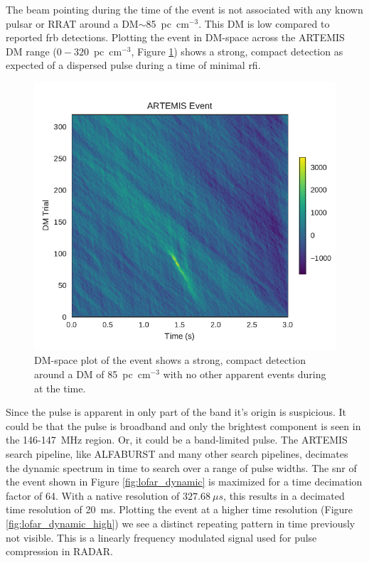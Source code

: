 \documentclass[a4paper,fleqn,usenatbib]{mnras}
\begin{document}
The beam pointing during the time of the event is not associated with any known
pulsar or RRAT around a DM$\sim$85~pc~cm$^{-3}$. This DM is low compared to
reported \gls{frb} detections.
Plotting the event in DM-space across the ARTEMIS DM range
($0-320$~pc~cm$^{-3}$, Figure \ref{fig:lofar_dm_time}) shows a strong, compact
detection as expected of a dispersed pulse during a time of minimal \gls{rfi}.

\begin{figure}
    \includegraphics[width=1.0\linewidth]{figures/LOFAR_dm_time.pdf}
    \caption{DM-space plot of the event shows a strong, compact detection around
    a DM of 85~pc~cm$^{-3}$ with no other apparent events during at the time.
    }
    \label{fig:lofar_dm_time}
\end{figure}

Since the pulse is apparent in only part of the band it's origin is suspicious.
It could be that the pulse is broadband and only the brightest component is seen
in the 146-147~MHz region. Or, it could be a band-limited pulse.  The ARTEMIS
search pipeline, like ALFABURST and many other search pipelines, decimates the
dynamic spectrum in time to search over a range of pulse widths.  The \gls{snr}
of the event shown in Figure \ref{fig:lofar_dynamic} is maximized for a time
decimation factor of 64. With a native resolution of $327.68~\mu s$, this
results in a decimated time resolution of 20~ms. Plotting the event at a higher
time resolution (Figure \ref{fig:lofar_dynamic_high}) we see a distinct
repeating pattern in time previously not visible. This is a linearly frequency
modulated signal used for pulse compression in RADAR.
\end{document}
